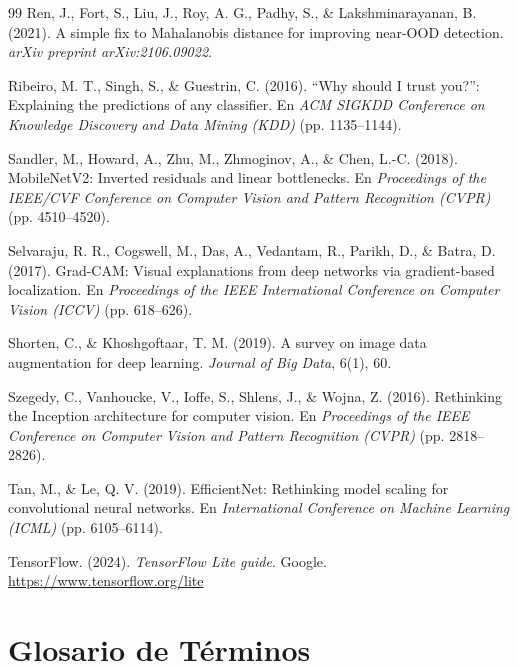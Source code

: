 \begin{singlespace}
\begin{thebibliography}{99}
Ren, J., Fort, S., Liu, J., Roy, A. G., Padhy, S., \& Lakshminarayanan, B. (2021). A simple fix to Mahalanobis distance for improving near-OOD detection. \textit{arXiv preprint arXiv:2106.09022}.

Ribeiro, M. T., Singh, S., \& Guestrin, C. (2016). ``Why should I trust you?'': Explaining the predictions of any classifier. En \textit{ACM SIGKDD Conference on Knowledge Discovery and Data Mining (KDD)} (pp. 1135--1144).

Sandler, M., Howard, A., Zhu, M., Zhmoginov, A., \& Chen, L.-C. (2018). MobileNetV2: Inverted residuals and linear bottlenecks. En \textit{Proceedings of the IEEE/CVF Conference on Computer Vision and Pattern Recognition (CVPR)} (pp. 4510--4520).

Selvaraju, R. R., Cogswell, M., Das, A., Vedantam, R., Parikh, D., \& Batra, D. (2017). Grad-CAM: Visual explanations from deep networks via gradient-based localization. En \textit{Proceedings of the IEEE International Conference on Computer Vision (ICCV)} (pp. 618--626).

Shorten, C., \& Khoshgoftaar, T. M. (2019). A survey on image data augmentation for deep learning. \textit{Journal of Big Data}, 6(1), 60.

Szegedy, C., Vanhoucke, V., Ioffe, S., Shlens, J., \& Wojna, Z. (2016). Rethinking the Inception architecture for computer vision. En \textit{Proceedings of the IEEE Conference on Computer Vision and Pattern Recognition (CVPR)} (pp. 2818--2826).

Tan, M., \& Le, Q. V. (2019). EfficientNet: Rethinking model scaling for convolutional neural networks. En \textit{International Conference on Machine Learning (ICML)} (pp. 6105--6114).

TensorFlow. (2024). \textit{TensorFlow Lite guide}. Google. \url{https://www.tensorflow.org/lite}

\end{thebibliography}
\end{singlespace}

\newpage
\chapter*{Glosario de T\'erminos}

